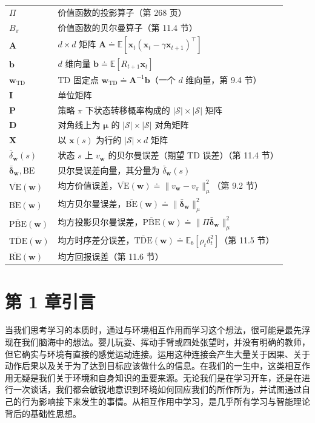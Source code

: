 \documentclass[UTF8, 12pt, fontset=fandol, oneside]{ctexart}
\begin{document}
\begin{longtable}{p{}p{}}
$\Pi$ & 价值函数的投影算子（第 268 页） \\
$B_\pi$ & 价值函数的贝尔曼算子（第 11.4 节） \\
$\mathbf{A}$ & $d\times d$ 矩阵 $\mathbf{A}\doteq\mathbb{E}\!\left[\mathbf{x}_t(\mathbf{x}_t-\gamma\mathbf{x}_{t+1})^\top\right]$ \\
$\mathbf{b}$ & $d$ 维向量 $\mathbf{b}\doteq\mathbb{E}[R_{t+1}\mathbf{x}_t]$ \\
$\mathbf{w}_{\mathrm{TD}}$ & TD 固定点 $\mathbf{w}_{\mathrm{TD}}\doteq\mathbf{A}^{-1}\mathbf{b}$（一个 $d$ 维向量，第 9.4 节） \\
$\mathbf{I}$ & 单位矩阵 \\
$\mathbf{P}$ & 策略 $\pi$ 下状态转移概率构成的 $|\mathcal{S}|\times|\mathcal{S}|$ 矩阵 \\
$\mathbf{D}$ & 对角线上为 $\boldsymbol{\mu}$ 的 $|\mathcal{S}|\times|\mathcal{S}|$ 对角矩阵 \\
$\mathbf{X}$ & 以 $\mathbf{x}(s)$ 为行的 $|\mathcal{S}|\times d$ 矩阵 \\
$\bar\delta_{\mathbf{w}}(s)$ & 状态 $s$ 上 $v_{\mathbf{w}}$ 的贝尔曼误差（期望 TD 误差）（第 11.4 节） \\
$\bar{\boldsymbol{\delta}}_{\mathbf{w}},\mathrm{BE}$ & 贝尔曼误差向量，其分量为 $\bar\delta_{\mathbf{w}}(s)$ \\
$\overline{\mathrm{VE}}(\mathbf{w})$ & 均方价值误差，$\overline{\mathrm{VE}}(\mathbf{w})\doteq\|v_{\mathbf{w}}-v_\pi\|_\mu^2$（第 9.2 节） \\
$\overline{\mathrm{BE}}(\mathbf{w})$ & 均方贝尔曼误差，$\overline{\mathrm{BE}}(\mathbf{w})\doteq\|\bar{\boldsymbol{\delta}}_{\mathbf{w}}\|_\mu^2$ \\
$\overline{\mathrm{PBE}}(\mathbf{w})$ & 均方投影贝尔曼误差，$\overline{\mathrm{PBE}}(\mathbf{w})\doteq\|\Pi\bar{\boldsymbol{\delta}}_{\mathbf{w}}\|_\mu^2$ \\
$\overline{\mathrm{TDE}}(\mathbf{w})$ & 均方时序差分误差，$\overline{\mathrm{TDE}}(\mathbf{w})\doteq\mathbb{E}_b[\rho_t\delta_t^2]$（第 11.5 节） \\
$\overline{\mathrm{RE}}(\mathbf{w})$ & 均方回报误差（第 11.6 节） \\
\end{longtable}

\section*{第 1 章\quad 引言}

当我们思考学习的本质时，通过与环境相互作用而学习这个想法，很可能是最先浮现在我们脑海中的想法。婴儿玩耍、挥动手臂或四处张望时，并没有明确的教师，但它确实与环境有直接的感觉运动连接。运用这种连接会产生大量关于因果、关于动作后果以及关于为了达到目标应该做什么的信息。在我们的一生中，这类相互作用无疑是我们关于环境和自身知识的重要来源。无论我们是在学习开车，还是在进行一次谈话，我们都会敏锐地意识到环境如何回应我们的所作所为，并试图通过自己的行为影响接下来发生的事情。从相互作用中学习，是几乎所有学习与智能理论背后的基础性思想。
\end{document}
